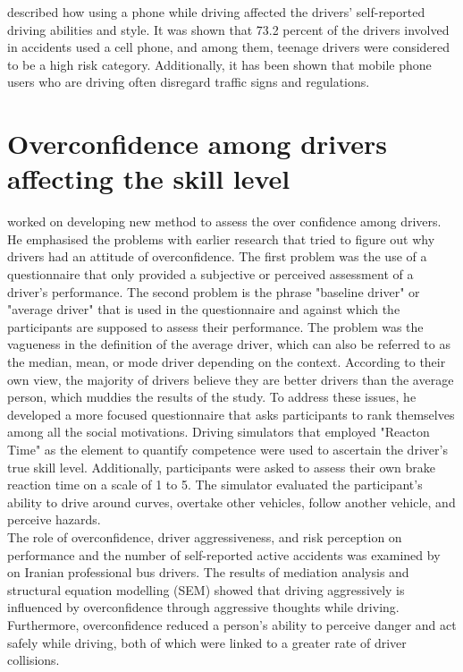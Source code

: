 \documentclass[12pt,letterpaper]{report}
\begin{document}
\textbf{\cite{bener2006effect}} described how using a phone while driving affected the drivers' self-reported driving abilities and style. It was shown that 73.2 percent of the drivers involved in accidents used a cell phone, and among them, teenage drivers were considered to be a high risk category. Additionally, it has been shown that mobile phone users who are driving often disregard traffic signs and regulations.\\

\section{Overconfidence among drivers affecting the skill level}
\textbf{\cite{moharrer2011actual}} worked on developing new method to assess the over confidence among drivers. He emphasised the problems with earlier research that tried to figure out why drivers had an attitude of overconfidence. The first problem was the use of a questionnaire that only provided a subjective or perceived assessment of a driver's performance. The second problem is the phrase "baseline driver" or "average driver" that is used in the questionnaire and against which the participants are supposed to assess their performance. The problem was the vagueness in the definition of the average driver, which can also be referred to as the median, mean, or mode driver depending on the context. According to their own view, the majority of drivers believe they are better drivers than the average person, which muddies the results of the study. To address these issues, he developed a more focused questionnaire that asks participants to rank themselves among all the social motivations. Driving simulators that employed "Reacton Time" as the element to quantify competence were used to ascertain the driver's true skill level. Additionally, participants were asked to assess their own brake reaction time on a scale of 1 to 5. The simulator evaluated the participant's ability to drive around curves, overtake other vehicles, follow another vehicle, and perceive hazards.\\

The role of overconfidence, driver aggressiveness, and risk perception on performance and the number of self-reported active accidents was examined by  \textbf{\cite{mohammadpour2021aggressive}} on Iranian professional bus drivers. The results of mediation analysis and structural equation modelling (SEM) showed that driving aggressively is influenced by overconfidence through aggressive thoughts while driving. Furthermore, overconfidence reduced a person's ability to perceive danger and act safely while driving, both of which were linked to a greater rate of driver collisions.
\end{document}
